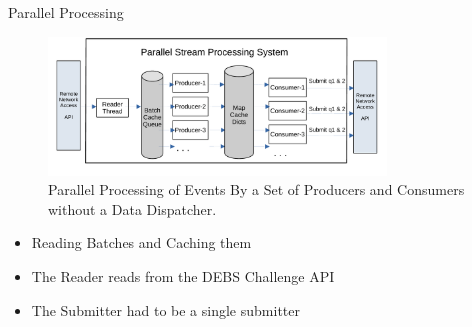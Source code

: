 \documentclass[9pt]{beamer}
\begin{document}
\begin{frame}[fragile]{Parallel Processing }


    \begin{figure}[ht]
        \begin{center}
            \includegraphics[width=0.8\textwidth]{../paper/images/Parallel-Stream-Processing-System_v2}
            \caption{Parallel Processing of Events By a Set of Producers and Consumers without a Data Dispatcher.}
            \label{fig:parallel-srream-processing1}
        \end{center}
    \end{figure}

    \begin{itemize}
        \item Reading Batches and Caching them 
        \item The Reader reads from the DEBS Challenge API
        \item The Submitter had to be a single submitter
    \end{itemize}

    
\end{frame}




\end{document}
